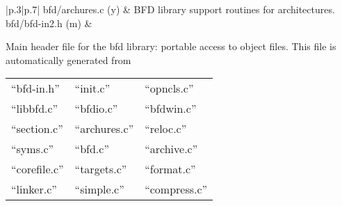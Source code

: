 \begin{table}[ht]
  \centering
  \begin{tabular}[h]{|p{.3\linewidth}|p{.7\linewidth}|}
\hline
bfd/archures.c (y)       &  BFD library support routines for architectures. \\
    \hline
bfd/bfd-in2.h (m)     & 
\begin{minipage}[h]{\linewidth}
  Main  header file  for the  bfd library:  portable access  to object
  files.  This file is automatically generated from

  \begin{tabular}[h]{|l|l|l|}
    \hline 
    ``bfd-in.h'' &    ``init.c'' &    ``opncls.c'' \\
    ``libbfd.c'' &    ``bfdio.c'' &   ``bfdwin.c'' \\
    ``section.c'' &   ``archures.c'' &``reloc.c''  \\
    ``syms.c'' &      ``bfd.c'' &     ``archive.c'' \\
    ``corefile.c'' &  ``targets.c'' & ``format.c'' \\
    ``linker.c'' &    ``simple.c''  &  ``compress.c''\\
    \hline 
  \end{tabular}


\end{minipage}
\end{tabular}
\end{table}
